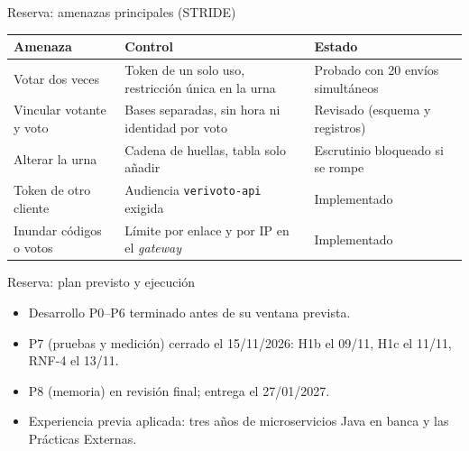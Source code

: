 \documentclass[aspectratio=169,11pt]{beamer}
\begin{document}
\begin{frame}{Reserva: amenazas principales (STRIDE)}
  \footnotesize
  \begin{tabular}{@{}>{\raggedright\arraybackslash}p{}>{\raggedright\arraybackslash}p{}>{\raggedright\arraybackslash}p{}@{}}
    \toprule
    \textbf{Amenaza} & \textbf{Control} & \textbf{Estado}\\
    \midrule
    Votar dos veces & Token de un solo uso, restricción única en la urna & Probado con 20 envíos simultáneos\\
    Vincular votante y voto & Bases separadas, sin hora ni identidad por voto & Revisado (esquema y registros)\\
    Alterar la urna & Cadena de huellas, tabla solo añadir & Escrutinio bloqueado si se rompe\\
    Token de otro cliente & Audiencia \texttt{verivoto-api} exigida & Implementado\\
    Inundar códigos o votos & Límite por enlace y por IP en el \emph{gateway} & Implementado\\
    \bottomrule
  \end{tabular}
\end{frame}

\begin{frame}{Reserva: plan previsto y ejecución}
  \small
  \begin{itemize}
    \item Desarrollo P0--P6 terminado antes de su ventana prevista.
    \item P7 (pruebas y medición) cerrado el 15/11/2026: H1b el 09/11, H1c el 11/11, RNF-4 el 13/11.
    \item P8 (memoria) en revisión final; entrega el 27/01/2027.
    \item Experiencia previa aplicada: tres años de microservicios Java en banca y las Prácticas Externas.
  \end{itemize}
\end{frame}
\end{document}
